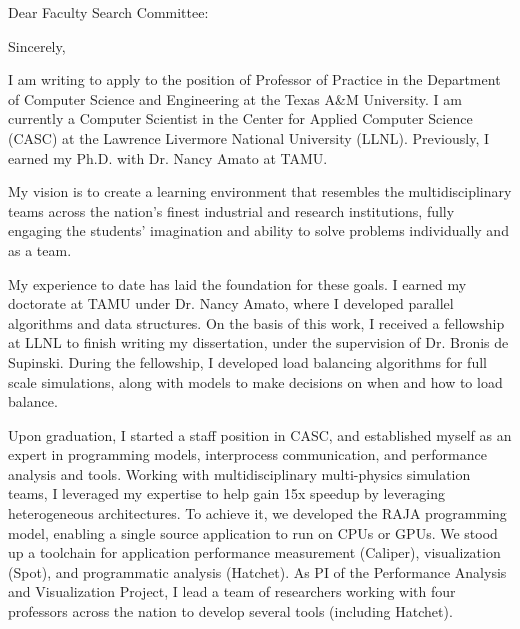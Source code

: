 \documentclass[10pt,letterpaper]{moderncv/moderncv}
\begin{document}
\hypersetup{
    colorlinks=true,%
    citecolor=black,%
    filecolor=black,%
    linkcolor=mylinkcolor,%
    urlcolor=mylinkcolor,%
    pdfborder=0 0 0%
}

\date{January 20, 2021}
\opening{Dear Faculty Search Committee:}
\closing{Sincerely,}
\makelettertitle%


I am writing to apply to the position of Professor of Practice in the Department of Computer Science and Engineering at the Texas A\&M University.  I am currently a Computer Scientist in the Center for Applied Computer Science (CASC) at the Lawrence Livermore National University (LLNL).  Previously, I earned my Ph.D. with Dr. Nancy Amato at TAMU.

My vision is to create a learning environment that resembles the multidisciplinary teams across the nation's finest industrial and research institutions,
fully engaging the students' imagination and ability to solve problems individually and as a team.

My experience to date has laid the foundation for these goals.  I earned my doctorate at TAMU under Dr. Nancy Amato, where I developed parallel algorithms and data structures.
On the basis of this work, I received a fellowship at LLNL to finish writing my dissertation, under the supervision of Dr. Bronis de Supinski.
During the fellowship, I developed load balancing algorithms for full scale simulations, along with models to make decisions on when and how to load balance.

Upon graduation, I started a staff position in CASC, and established myself as an expert in programming models, interprocess communication, and performance analysis and tools.
Working with multidisciplinary multi-physics simulation teams, I leveraged my expertise to help gain 15x speedup by leveraging heterogeneous architectures.
To achieve it, we developed the RAJA programming model, enabling a single source application to run on CPUs or GPUs.
We stood up a toolchain for application performance measurement (Caliper), visualization (Spot), and programmatic analysis (Hatchet).
As PI of the Performance Analysis and Visualization Project, I lead a team of researchers working with four professors across the nation
to develop several tools (including Hatchet).
\end{document}

